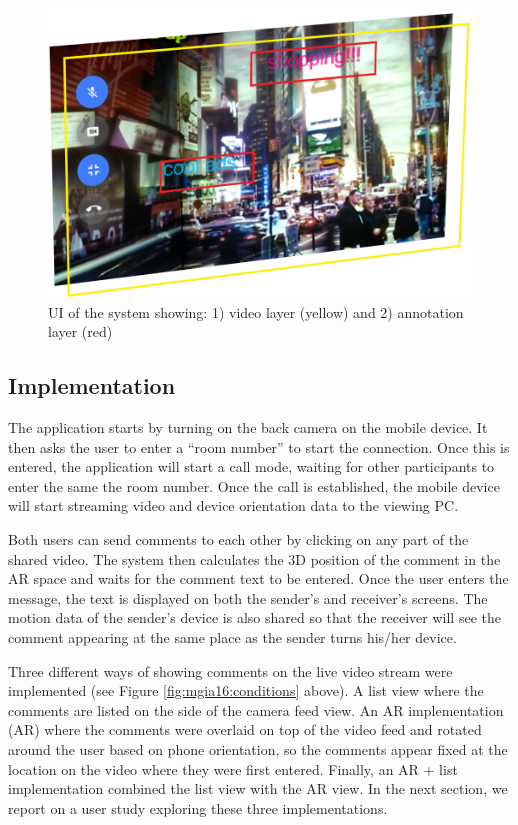 \begin{figure}[h]
  \centering
  \includegraphics[width=.8\linewidth]{images/mgia16/layers.png}
  \caption{UI of the system showing: 1) video layer (yellow) and 2) annotation layer (red)}
	\label{fig:mgia16:layers}
\end{figure}

\subsection{Implementation}

The application starts by turning on the back camera on the mobile device. It then asks the user to enter a “room number” to start the connection. Once this is entered, the application will start a call mode, waiting for other participants to enter the same the room number. Once the call is established, the mobile device will start streaming video and device orientation data to the viewing PC. 

Both users can send comments to each other by clicking on any part of the shared video. The system then calculates the 3D position of the comment in the AR space and waits for the comment text to be entered. Once the user enters the message, the text is displayed on both the sender's and receiver's screens. The motion data of the sender's device is also shared so that the receiver will see the comment appearing at the same place as the sender turns his/her device. 

Three different ways of showing comments on the live video stream were implemented (see Figure \ref{fig:mgia16:conditions} above). A list view where the comments are listed on the side of the camera feed view. An AR implementation (AR) where the comments were overlaid on top of the video feed and rotated around the user based on phone orientation, so the comments appear fixed at the location on the video where they were first entered. Finally, an AR + list implementation combined the list view with the AR view. In the next section, we report on a user study exploring these three implementations.

